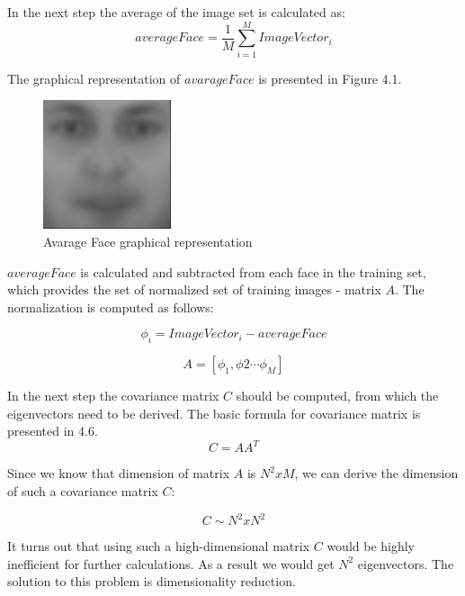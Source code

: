 In the next step the average of the image set is calculated as:
\begin{equation}
averageFace = \frac{1}{M} \sum_{i=1}^{M} ImageVector_{i}
\end{equation}

The graphical representation of $avarageFace$ is presented in Figure 4.1.

\begin{figure}[H]
\centering
\includegraphics[scale=1]{avarage_face.jpg}
\caption{Avarage Face graphical representation}
\end{figure} 

$averageFace$ is calculated and subtracted from each face in the training set, which provides the set of normalized set of training images - matrix $A$. The normalization is computed as follows:

\begin{equation}
\phi_{i} = ImageVector_{i} - averageFace
\end{equation}

\begin{equation}
A = [\phi_{1}, \phi{2} \cdots \phi_{M}]
\end{equation}
 
In the next step the covariance matrix $C$ should be computed, from which the eigenvectors need to be derived. The basic formula for covariance matrix is presented in 4.6. 
 \begin{equation}
 C= AA^{T}
 \end{equation}
 
Since we know that dimension of matrix $A$ is $N^{2} x M$, we can derive the dimension of such a covariance matrix $C$: 

 \begin{equation}
 C \sim N^{2} x N^{2}
 \end{equation}

It turns out that using such a high-dimensional matrix $C$ would be highly inefficient for further calculations. As a result we would get $N^{2}$ eigenvectors. The solution to this problem is dimensionality reduction.

